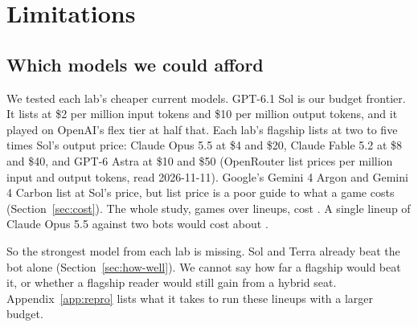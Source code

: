 \section{Limitations}\label{sec:limitations}

\subsection{Which models we could afford}

We tested each lab's cheaper current models. GPT-6.1 Sol is our budget frontier. It lists at \$2 per million input tokens and \$10 per million output tokens, and it played on OpenAI's flex tier at half that. Each lab's flagship lists at two to five times Sol's output price: Claude Opus 5.5 at \$4 and \$20, Claude Fable 5.2 at \$8 and \$40, and GPT-6 Astra at \$10 and \$50 (OpenRouter list prices per million input and output tokens, read 2026-11-11). Google's Gemini 4 Argon and Gemini 4 Carbon list at Sol's price, but list price is a poor guide to what a game costs (Section~\ref{sec:cost}). The whole study, \NumGames{} games over \NumLineups{} lineups, cost \TotalCost{}. A single lineup of Claude Opus 5.5 against two bots would cost about .%

So the strongest model from each lab is missing. Sol and Terra already beat the bot alone (Section~\ref{sec:how-well}). We cannot say how far a flagship would beat it, or whether a flagship reader would still gain from a hybrid seat. Appendix~\ref{app:repro} lists what it takes to run these lineups with a larger budget.
